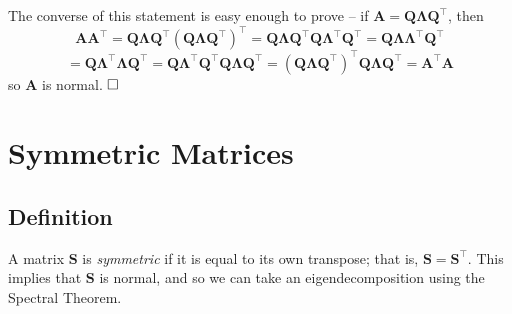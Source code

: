 \documentclass{article}
\begin{document}
The converse of this statement is easy enough to prove -- if $\mathbf{A} = \mathbf{Q\Lambda Q^{\top}}$, then $$\mathbf{AA^{\top}} = \mathbf{Q\Lambda Q^{\top}(Q\Lambda Q^{\top})^{\top}} = \mathbf{Q\Lambda Q^{\top}Q\Lambda^{\top}Q^{\top}} = \mathbf{Q\Lambda\Lambda^{\top}Q^{\top}}$$ $$= \mathbf{Q\Lambda^{\top}\Lambda Q^{\top}} = \mathbf{Q\Lambda^{\top}Q^{\top}Q\Lambda Q^{\top}} = \mathbf{(Q\Lambda Q^{\top})^{\top}Q\Lambda Q^{\top}} = \mathbf{A^{\top}A}$$
so $\mathbf{A}$ is normal. $\hfill\square$

\section{Symmetric Matrices}

\subsection{Definition}
A matrix $\mathbf{S}$ is \textit{symmetric} if it is equal to its own transpose; that is, $\mathbf{S} = \mathbf{S^{\top}}$. This implies that $\mathbf{S}$ is normal, and so we can take an eigendecomposition using the Spectral Theorem. 
\end{document}
